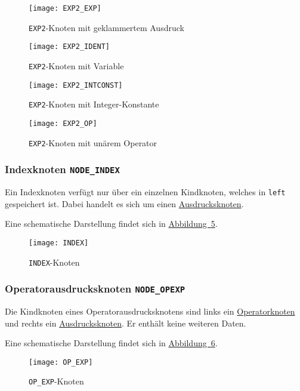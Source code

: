 \begin{figure}[h!]
\centering
\texttt{[image: EXP2\_EXP]}
\caption{\texttt{EXP2}-Knoten mit geklammertem Ausdruck}
\label{fig:exp}
\end{figure}

\begin{figure}[h!]
\centering
\texttt{[image: EXP2\_IDENT]}
\caption{\texttt{EXP2}-Knoten mit Variable}
\label{fig:ident}
\end{figure}

\begin{figure}[h!]
\centering
\texttt{[image: EXP2\_INTCONST]}
\caption{\texttt{EXP2}-Knoten mit Integer-Konstante}
\label{fig:intconst}
\end{figure}

\begin{figure}[h!]
\centering
\texttt{[image: EXP2\_OP]}
\caption{\texttt{EXP2}-Knoten mit unärem Operator}
\label{fig:op}
\end{figure}

\subsubsection{Indexknoten \texttt{NODE\_INDEX}}
\label{sec:indexnode}
Ein Indexknoten verfügt nur über ein einzelnen Kindknoten,
welches in \texttt{left} gespeichert ist.
Dabei handelt es sich um einen \hyperref[sec:expnode]{Ausdrucksknoten}.

Eine schematische Darstellung findet sich in \hyperref[fig:indexnode]{Abbildung~\ref{fig:indexnode}}.

\begin{figure}[h!]
\centering
\texttt{[image: INDEX]}
\caption{\texttt{INDEX}-Knoten}
\label{fig:indexnode}
\end{figure}

\subsubsection{Operatorausdrucksknoten \texttt{NODE\_OPEXP}}
\label{sec:opexpnode}
Die Kindknoten eines Operatorausdrucksknotens sind links ein \hyperref[sec:opnode]{Operatorknoten} und rechts ein \hyperref[sec:expnode]{Ausdrucksknoten}.
Er enthält keine weiteren Daten.

Eine schematische Darstellung findet sich in \hyperref[fig:opexpnode]{Abbildung~\ref{fig:opexpnode}}.

\begin{figure}[h!]
\centering
\texttt{[image: OP\_EXP]}
\caption{\texttt{OP\_EXP}-Knoten}
\label{fig:opexpnode}
\end{figure}

